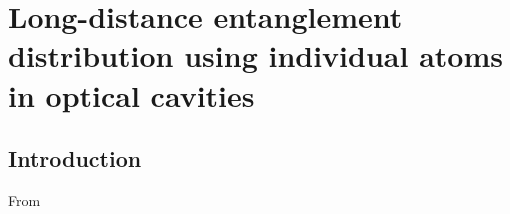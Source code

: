 \chapter{Long-distance entanglement distribution using individual atoms in
optical cavities}
\label{ch:Borregaard_PRA2015}
 
\section{Introduction}
From \cite{Borregaard2015b}